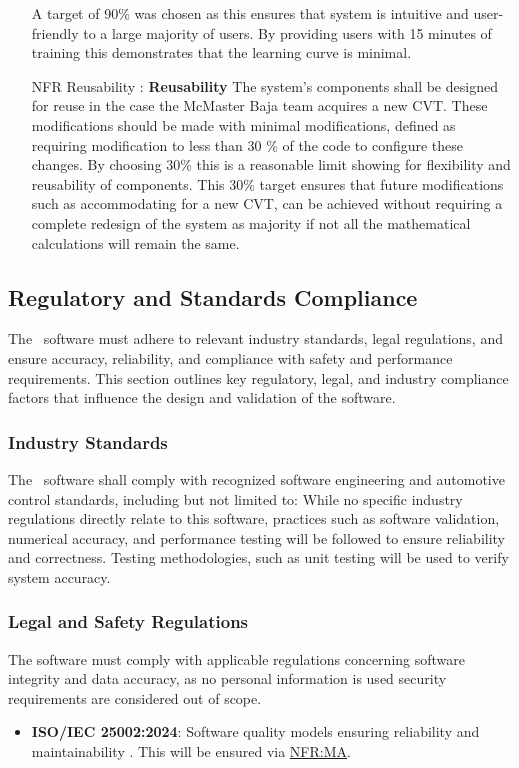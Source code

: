 \documentclass[12pt]{article}
\newcommand{\hpref}[1]{\hyperref[#1]{#1}}
\begin{document}
\begin{itemize}
A target of 90\% was chosen as this ensures that system is intuitive and user-friendly to a large majority of users. 
By providing users with 15 minutes of training this demonstrates that the learning curve is minimal. 
\item[NFR Reusability \label{NFR:RE}:] \textbf{Reusability} The system's components shall be designed for reuse in the case the McMaster Baja team acquires a new CVT. 
These modifications should be made with minimal modifications, defined as requiring modification to less than 30 \% of the code to configure these changes.
By choosing 30\% this is a reasonable limit showing for flexibility and reusability of components. 
This 30\% target ensures that future modifications such as accommodating for a new CVT, can be achieved without requiring a complete redesign of the system as majority if not all the mathematical calculations will remain the same.

\end{itemize}

\subsection{Regulatory and Standards Compliance}
The \progname \ software must adhere to relevant industry standards, legal regulations, and ensure accuracy, reliability, and compliance with safety and performance requirements. 
This section outlines key regulatory, legal, and industry compliance factors that influence the design and validation of the software.

\subsubsection{Industry Standards}
The \progname \ software shall comply with recognized software engineering and automotive control standards, including but not limited to:
While no specific industry regulations directly relate to this software, practices such as software validation, numerical accuracy, and performance testing will be followed to ensure reliability and correctness. 
Testing methodologies, such as unit testing will be used to verify system accuracy.

\subsubsection{Legal and Safety Regulations}
The software must comply with applicable regulations concerning software integrity and data accuracy, as no personal information is used security requirements are considered out of scope.
\begin{itemize}
    \item \textbf{ISO/IEC 25002:2024}: Software quality models ensuring reliability and maintainability \cite{ISO26262Standard}. This will be ensured via \hpref{NFR:MA}. 
\end{itemize}
\end{document}
